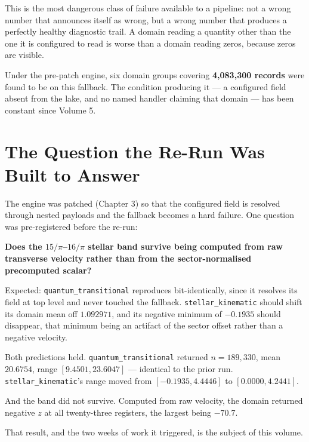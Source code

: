 \documentclass[11pt, letterpaper, openany]{book}
\begin{document}
\begin{warningbox}
This is the most dangerous class of failure available to a pipeline: not a wrong number that
announces itself as wrong, but a wrong number that produces a perfectly healthy diagnostic
trail. A domain reading a quantity other than the one it is configured to read is worse than a
domain reading zeros, because zeros are visible.
\end{warningbox}

Under the pre-patch engine, six domain groups covering \textbf{4{,}083{,}300 records} were
found to be on this fallback. The condition producing it --- a configured field absent from the
lake, and no named handler claiming that domain --- has been constant since Volume 5.

\section{The Question the Re-Run Was Built to Answer}

The engine was patched (Chapter 3) so that the configured field is resolved through nested
payloads and the fallback becomes a hard failure. One question was pre-registered before the
re-run:

\begin{predictionbox}
\textbf{Does the $15/\pi$--$16/\pi$ stellar band survive being computed from raw transverse
velocity rather than from the sector-normalised precomputed scalar?}

\medskip
\noindent Expected: \texttt{quantum\_transitional} reproduces bit-identically, since it resolves
its field at top level and never touched the fallback. \texttt{stellar\_kinematic} should shift
its domain mean off $1.092971$, and its negative minimum of $-0.1935$ should disappear, that
minimum being an artifact of the sector offset rather than a negative velocity.
\end{predictionbox}

Both predictions held. \texttt{quantum\_transitional} returned $n = 189{,}330$, mean $20.6754$,
range $[9.4501, 23.6047]$ --- identical to the prior run. \texttt{stellar\_kinematic}'s range
moved from $[-0.1935, 4.4446]$ to $[0.0000, 4.2441]$.

And the band did not survive. Computed from raw velocity, the domain returned negative $z$ at
all twenty-three registers, the largest being $-70.7$.

That result, and the two weeks of work it triggered, is the subject of this volume.
\end{document}
